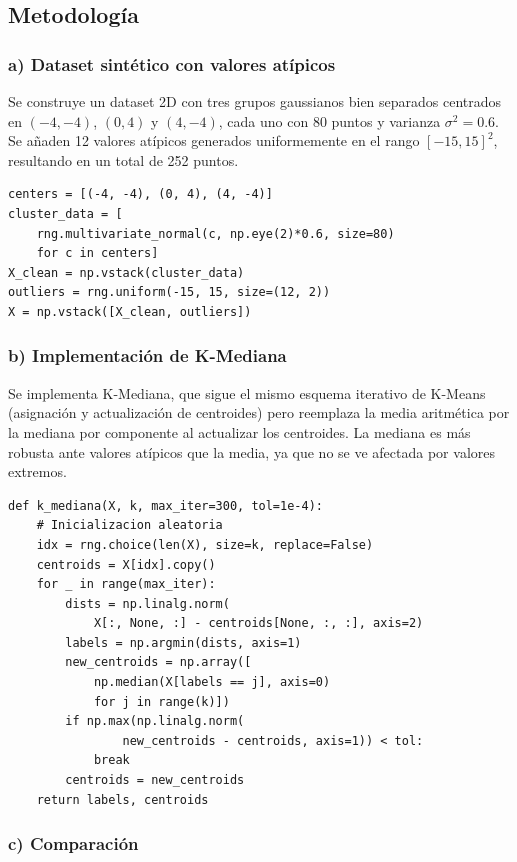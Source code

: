 \documentclass{article}
\begin{document}
\subsection{Metodología}

\subsubsection{a) Dataset sintético con valores atípicos}

Se construye un dataset 2D con tres grupos gaussianos bien separados centrados en $(-4, -4)$, $(0, 4)$ y $(4, -4)$, cada uno con 80 puntos y varianza $\sigma^2 = 0.6$. Se añaden 12 valores atípicos generados uniformemente en el rango $[-15, 15]^2$, resultando en un total de 252 puntos.

\begin{lstlisting}
centers = [(-4, -4), (0, 4), (4, -4)]
cluster_data = [
    rng.multivariate_normal(c, np.eye(2)*0.6, size=80)
    for c in centers]
X_clean = np.vstack(cluster_data)
outliers = rng.uniform(-15, 15, size=(12, 2))
X = np.vstack([X_clean, outliers])
\end{lstlisting}

\subsubsection{b) Implementación de K-Mediana}

Se implementa K-Mediana, que sigue el mismo esquema iterativo de K-Means (asignación y actualización de centroides) pero reemplaza la media aritmética por la mediana por componente al actualizar los centroides. La mediana es más robusta ante valores atípicos que la media, ya que no se ve afectada por valores extremos.

\begin{lstlisting}
def k_mediana(X, k, max_iter=300, tol=1e-4):
    # Inicializacion aleatoria
    idx = rng.choice(len(X), size=k, replace=False)
    centroids = X[idx].copy()
    for _ in range(max_iter):
        dists = np.linalg.norm(
            X[:, None, :] - centroids[None, :, :], axis=2)
        labels = np.argmin(dists, axis=1)
        new_centroids = np.array([
            np.median(X[labels == j], axis=0)
            for j in range(k)])
        if np.max(np.linalg.norm(
                new_centroids - centroids, axis=1)) < tol:
            break
        centroids = new_centroids
    return labels, centroids
\end{lstlisting}

\subsubsection{c) Comparación}
\end{document}
